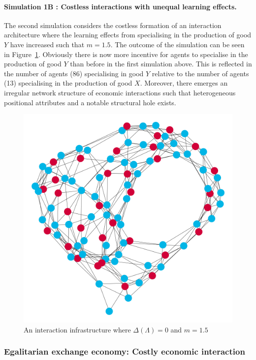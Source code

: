 \paragraph{Simulation 1B : Costless interactions with unequal learning effects.}

The second simulation considers the costless formation of an interaction architecture where the learning effects from specialising in the production of good $Y$ have increased such that $m = 1.5$. The outcome of the simulation can be seen in Figure~\ref{Sim2}. Obviously there is now more incentive for agents to specialise in the production of good $Y$ than before in the first simulation above. This is reflected in the number of agents (86) specialising in good $Y$ relative to the number of agents (13) specialising in the production of good $X$. Moreover, there emerges an irregular network structure of economic interactions such that heterogeneous positional attributes and a notable structural hole exists.

\begin{figure}[t]
\centering
\includegraphics[scale=0.22]{Images/Sim2E.png}
\caption{An interaction infrastructure where $\Delta(\Lambda)=0$ and $m=1.5$}
\label{Sim2}
\end{figure}

\subsubsection{Egalitarian exchange economy: Costly economic interaction}

